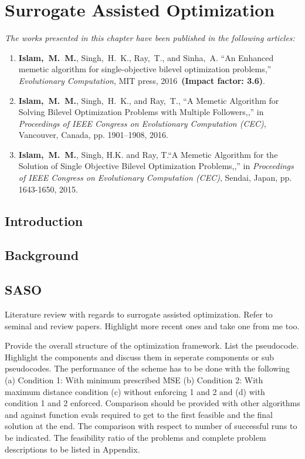 \chapter{Surrogate Assisted Optimization}
\label{chapter:3}

\begin{tcolorbox}
\textit{The works presented in this chapter have been published in the following articles:}
\begin{enumerate}
\small
\item \textbf{Islam,~M.~M.}, {Singh,~H.~K.},  {Ray,~T.}, and {Sinha,~A.} ``An Enhanced memetic algorithm for single-objective bilevel optimization problems,'' {\em Evolutionary Computation}, MIT press, 2016~\textbf{(Impact factor: 3.6)}.
\item \textbf{Islam,~M.~M.}, {Singh,~H.~K.}, and {Ray,~T.}, ``A Memetic Algorithm for Solving Bilevel Optimization Problems with Multiple Followers,,'' in {\em Proceedings of IEEE Congress on Evolutionary Computation (CEC)}, Vancouver, Canada, pp. 1901--1908, 2016.
\item  \textbf{Islam,~M.~M.}, {Singh, H.K.} and {Ray, T.}``A Memetic Algorithm for the Solution of Single Objective Bilevel Optimization Problems,,'' in {\em Proceedings of IEEE Congress on Evolutionary Computation (CEC)}, Sendai, Japan, pp. 1643-1650, 2015.

\end{enumerate}

\end{tcolorbox}


\section{Introduction}
\label{sec:intro}






\section{Background}
\label{sec:back}

\section{SASO}

Literature review with regards to surrogate assisted optimization. Refer to seminal and review papers. Highlight more recent ones and take one from me too.

Provide the overall structure of the optimization framework. List the pseudocode. Highlight the components and discuss them in seperate components or sub pseudocodes.
The performance of the scheme has to be done with the following (a) Condition 1: With minimum prescribed MSE (b) Condition 2: With maximum distance condition (c) without enforcing 1 and 2 and (d) with condition 1 and 2 enforced. Comparison should be provided with other algorithms and against function evals required to get to the first feasible and the final solution at the end. The comparison with respect to number of successful runs to be indicated. The feasibility ratio of the problems and complete problem descriptions to be listed in Appendix.

